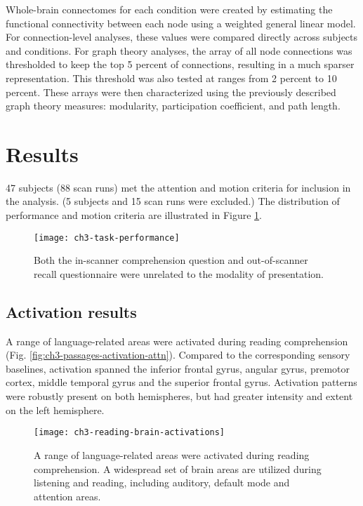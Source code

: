 Whole-brain connectomes for each condition were created by estimating the functional connectivity between each node using a weighted general linear model. For connection-level analyses, these values were compared directly across subjects and conditions. For graph theory analyses, the array of all node connections was thresholded to keep the top 5 percent of connections, resulting in a much sparser representation. This threshold was also tested at ranges from 2 percent to 10 percent. These arrays were then characterized using the previously described graph theory measures: modularity, participation coefficient, and path length.


\section{Results}

47 subjects (88 scan runs) met the attention and motion criteria for inclusion in the analysis. (5 subjects and 15 scan runs were excluded.) The distribution of performance and motion criteria are illustrated in Figure \ref{fig:ch3-task-performance}. 

\begin{figure}[t]
	\centering
	\texttt{[image: ch3-task-performance]}
    \caption[Behavioral metrics of passage performance were unrelated to modality.]{Both the in-scanner comprehension question and out-of-scanner recall questionnaire were unrelated to the modality of presentation.}
	\label{fig:ch3-task-performance}
\end{figure}

\subsection{Activation results}

A range of language-related areas were activated during reading comprehension (Fig. \ref{fig:ch3-passages-activation-attn}). Compared to the corresponding sensory baselines, activation spanned the inferior frontal gyrus, angular gyrus, premotor cortex, middle temporal gyrus and the superior frontal gyrus. Activation patterns were robustly present on both hemispheres, but had greater intensity and extent on the left hemisphere. 

\begin{figure}[t]
	\centering
	\texttt{[image: ch3-reading-brain-activations]}
    \caption[A range of language-related areas were activated during reading comprehension.]{A range of language-related areas were activated during reading comprehension. A widespread set of brain areas are utilized during listening and reading, including auditory, default mode and attention areas.}
	\label{fig:ch3-reading-brain-activations}
\end{figure}

